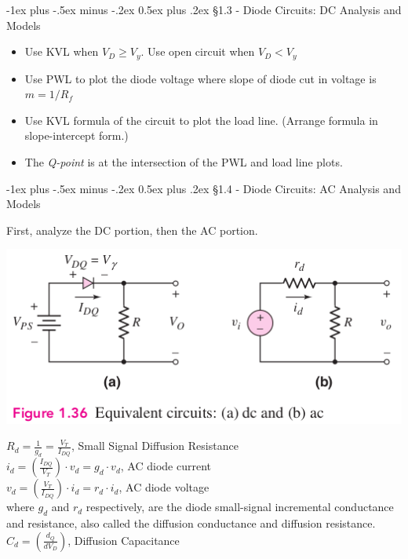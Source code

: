\documentclass[10pt,landscape]{article}
\makeatletter
\renewcommand{\section}{\@startsection{section}{1}{0mm}%
                                {-1ex plus -.5ex minus -.2ex}%
                                {0.5ex plus .2ex}%
                                {\normalfont\large\bfseries}}
\makeatother
\begin{document}
\begin{multicols}{3}
\section{\S1.3 - Diode Circuits: DC Analysis and Models}

\begin{itemize}
	\item Use KVL when $V_D \geq V_y$. Use open circuit when $V_D < V_y$
	\item Use PWL to plot the diode voltage where slope of diode cut in voltage is $m = 1/R_f$
	\item Use KVL formula of the circuit to plot the load line. (Arrange formula in slope-intercept form.)
	\item The \textit{Q-point} is at the intersection of the PWL and load line plots.
\end{itemize}

\section{\S1.4 - Diode Circuits: AC Analysis and Models}

First, analyze the DC portion, then the AC portion.

\includegraphics[width = \linewidth]{./img/f1.36.png}

$R_d = \frac{1}{g_d} = \frac{V_T}{I_{DQ}}$, Small Signal Diffusion Resistance\\
$i_d = \left(\frac{I_{DQ}}{V_T}\right) \cdot v_d = g_d \cdot v_d$, AC diode current\\
$v_d = \left(\frac{V_T}{I_{DQ}}\right) \cdot i_d = r_d \cdot i_d$, AC diode voltage\\
where $g_d$ and $r_d$ respectively, are the diode small-signal incremental conductance and resistance, also called the diffusion conductance and diffusion resistance.\\
$C_d = \left(\frac{d_Q}{dV_D}\right)$, Diffusion Capacitance\\


\end{multicols}
\end{document}
